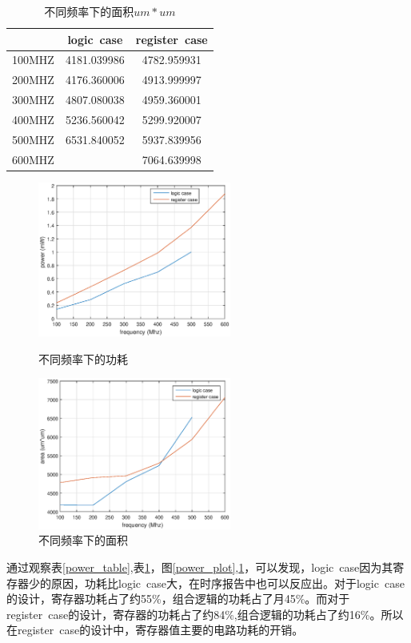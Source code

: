 \documentclass[12pt]{article}
\begin{document}
\begin{table}[H]
\centering
\begin{tabular}{ccc}
\hline 
& logic~case & register~case\\
\hline 
100MHZ & 4181.039986& 4782.959931\\
200MHZ & 4176.360006& 4913.999997\\
300MHZ & 4807.080038& 4959.360001\\
400MHZ & 5236.560042& 5299.920007\\
500MHZ & 6531.840052& 5937.839956\\
600MHZ &  & 7064.639998\\
\hline 
\end{tabular}
\caption{不同频率下的面积$um*um$}
\label{area_table}

\end{table}

\begin{figure}[H]
\begin{minipage}[t]{0.5\linewidth}
\centering
\includegraphics[width=2.5in]{./powerandarea/power_plot.eps}
\caption{不同频率下的功耗}
\label{power_plot}
\end{minipage}%
\begin{minipage}[t]{0.5\linewidth}
\centering
\includegraphics[width=2.5in]{./powerandarea/plot_area.eps}
\caption{不同频率下的面积}
\label{area_plot}
\end{minipage}
\end{figure}


通过观察表\ref{power_table},表\ref{area_table}，图\ref{power_plot},\ref{area_plot}，可以发现，logic~case因为其寄存器少的原因，功耗比logic~case大，在时序报告中也可以反应出。对于logic~case的设计，寄存器功耗占了约55\%，组合逻辑的功耗占了月45\%。而对于register~case的设计，寄存器的功耗占了约84\%,组合逻辑的功耗占了约16\%。所以在register~case的设计中，寄存器值主要的电路功耗的开销。
\end{document}
